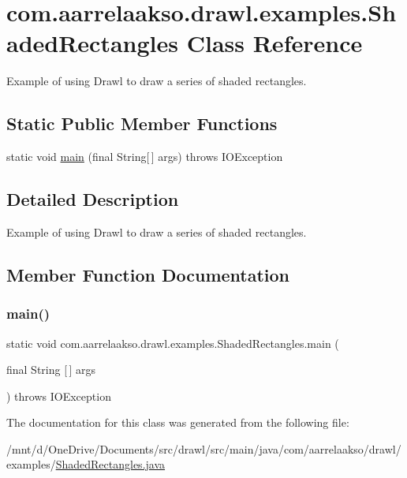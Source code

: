 \hypertarget{classcom_1_1aarrelaakso_1_1drawl_1_1examples_1_1_shaded_rectangles}{}\section{com.\+aarrelaakso.\+drawl.\+examples.\+Shaded\+Rectangles Class Reference}
\label{classcom_1_1aarrelaakso_1_1drawl_1_1examples_1_1_shaded_rectangles}


Example of using Drawl to draw a series of shaded rectangles.  


\subsection*{Static Public Member Functions}
\begin{DoxyCompactItemize}
\item 
static void \hyperlink{classcom_1_1aarrelaakso_1_1drawl_1_1examples_1_1_shaded_rectangles_ab424863604fa74c48452d2c267e16463}{main} (final String\mbox{[}$\,$\mbox{]} args)  throws I\+O\+Exception     
\end{DoxyCompactItemize}


\subsection{Detailed Description}
Example of using Drawl to draw a series of shaded rectangles. 

\subsection{Member Function Documentation}
\mbox{\label{classcom_1_1aarrelaakso_1_1drawl_1_1examples_1_1_shaded_rectangles_ab424863604fa74c48452d2c267e16463}} 
\subsubsection{\texorpdfstring{main()}{main()}}
{\footnotesize\ttfamily static void com.\+aarrelaakso.\+drawl.\+examples.\+Shaded\+Rectangles.\+main (\begin{DoxyParamCaption}\item[{final String \mbox{[}$\,$\mbox{]}}]{args }\end{DoxyParamCaption}) throws I\+O\+Exception\hspace{0.3cm}{\ttfamily [static]}}



The documentation for this class was generated from the following file\+:\begin{DoxyCompactItemize}
\item 
/mnt/d/\+One\+Drive/\+Documents/src/drawl/src/main/java/com/aarrelaakso/drawl/examples/\hyperlink{_shaded_rectangles_8java}{Shaded\+Rectangles.\+java}\end{DoxyCompactItemize}
